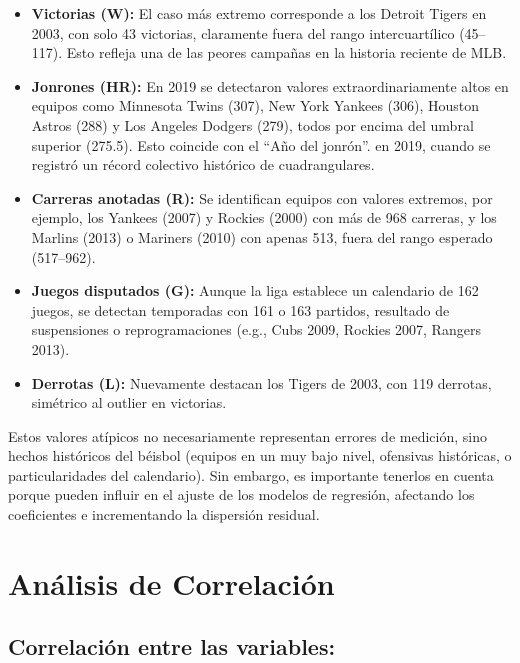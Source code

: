\documentclass[man,floatsintext]{apa7}
\begin{document}
\begin{itemize}
    \item \textbf{Victorias (W):} El caso más extremo corresponde a los Detroit Tigers en 2003, con solo 43 victorias, claramente fuera del rango intercuartílico (45--117). Esto refleja una de las peores campañas en la historia reciente de MLB.
    \item \textbf{Jonrones (HR):} En 2019 se detectaron valores extraordinariamente altos en equipos como Minnesota Twins (307), New York Yankees (306), Houston Astros (288) y Los Angeles Dodgers (279), todos por encima del umbral superior (275.5). Esto coincide con el ``Año del jonrón''. en 2019, cuando se registró un récord colectivo histórico de cuadrangulares.
    \item \textbf{Carreras anotadas (R):} Se identifican equipos con valores extremos, por ejemplo, los Yankees (2007) y Rockies (2000) con más de 968 carreras, y los Marlins (2013) o Mariners (2010) con apenas 513, fuera del rango esperado (517--962).
    \item \textbf{Juegos disputados (G):} Aunque la liga establece un calendario de 162 juegos, se detectan temporadas con 161 o 163 partidos, resultado de suspensiones o reprogramaciones (e.g., Cubs 2009, Rockies 2007, Rangers 2013).
    \item \textbf{Derrotas (L):} Nuevamente destacan los Tigers de 2003, con 119 derrotas, simétrico al outlier en victorias.
\end{itemize}

Estos valores atípicos no necesariamente representan errores de medición, sino hechos históricos del béisbol (equipos en un muy bajo nivel, ofensivas históricas, o particularidades del calendario). Sin embargo, es importante tenerlos en cuenta porque pueden influir en el ajuste de los modelos de regresión, afectando los coeficientes e incrementando la dispersión residual.
\section{Análisis de Correlación}
\subsection{Correlación entre las variables:}
\end{document}
